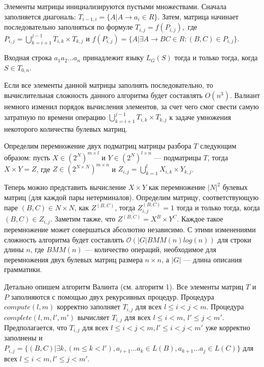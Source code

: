 Элементы матрицы инициализируются пустыми множествами.
Сначала заполняется диагональ: $T_{i - 1, i} = \{ A | A \rightarrow a_{i} \in R\}.$
Затем, матрица начинает последовательно заполняться по формуле
$T_{i, j} = f(P_{i, j}),$
где $P_{i, j} = \bigcup\limits_{k = i + 1}^{j - 1} T_{i,k} \times T_{k, j}$ и
$f(P_{i, j}) = \{A | \exists A \rightarrow BC \in R : (B, C) \in P_{i, j}\}.$

Входная строка $a_{1}a_{2} \dots a_{n}$ принадлежит языку $L_{G}(S)$ тогда и только тогда, когда $S \in T_{0, n}$.

Если все элементы данной матрицы заполнять последовательно, то вычислительная сложность данного алгоритма будет составлять $O(n^3)$. Валиант немного изменил порядок вычисления элементов, за счет чего смог свести самую затратную по времени операцию $\bigcup\limits_{k = i + 1}^{j - 1} T_{i, k} \times T_{k, j}$ к задаче умножения некоторого количества булевых матриц.

Определим перемножение двух подматриц матрицы разбора $T$ следующим образом: пусть $X \in (2^N)^{m \times l}$ и $Y \in (2^N)^{l \times n}$ --- подматрицы $T$, тогда $X \times Y = Z$, где $Z \in (2^{N \times N})^{m \times n}$ и $Z_{i, j} = \bigcup\limits_{k = 1}^{l} X_{i, k} \times Y_{k, j}$.

Теперь можно представить вычисление $X \times Y$ как перемножение $|N|^2$ булевых матриц (для каждой пары нетерминалов).
Определим матрицу, соответствующую паре $(B, C) \in N \times N$, как $Z^{(B, C)}$, тогда $Z_{i, j}^{(B, C)} = 1$ тогда и только тогда, когда $(B, C) \in Z_{i, j}$.
Заметим также, что $Z^{(B, C)} = X^{B} \times Y^{C}$.
Каждое такое перемножение может совершаться абсолютно независимо.
С этими изменениями сложность алгоритма будет составлять $\mathcal{O}(|G|BMM(n)log(n))$ для строки длины $n$, где $BMM(n)$ --- количество операций, необходимое для перемножения двух булевых матриц размера $n \times n$, а $|G|$ --- длина описания грамматики.

Детально опишем алгоритм Валинта (см. алгоритм 1).
Все элементы матриц $T$ и $P$ заполняются с помощью двух рекурсивных процедур.
Процедура $compute(l, m)$ корректно заполняет $T_{i,j}$ для всех $l \le i < j < m$.
Процедура $complete(l, m, l', m')$ вычисляет $T_{i, j}$ для всех $l \le i < m$, $l' \le j < m'$. Предполагается, что $T_{i, j}$ для всех $l \leq i < j < m,  l' \leq i < j < m'$ уже корректно заполнены и $P_{i, j} =  \{ (B, C) |\exists k, (m \le k < l'), a_{i + 1} \dots a_{k} \in L(B), a_{k + 1} \dots a_{j} \in L(C)\}$ для всех $l \leq i < m,  l' \leq j < m'$.


